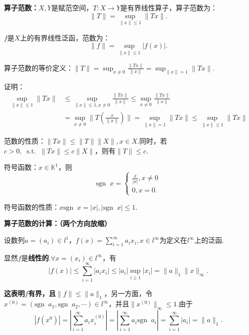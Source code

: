 \documentclass[bwprint, withoutpreface]{cumcmthesis}
\newcommand*{\st}{\mathop{}\!\mathrm{s.t.}\!\mathop{}}
\newcommand*{\norm}[1]{\| #1 \|}
\newcommand*{\nnorm}[2]{\| #1 \|_{#2}}
\newcommand*{\sgn}[1]{\mathrm{sgn}\!\mathop{}#1}
\begin{document}
\textbf{算子范数：}$X, Y$是赋范空间，$T:X \to Y$是有界线性算子，算子范数为：\[\norm{T} = \sup_{\norm{x} \leqslant 1}{\norm{Tx}}.\]

$f$是$X$上的有界线性泛函，范数为：\[\norm{f} = \sup_{\norm{x} \leqslant 1}{|f(x)|}.\]

算子范数的等价定义：$\norm{T} = \sup_{x \neq 0}{\frac{\norm{Tx}}{\norm{x}}} = \sup_{\norm{x} = 1}{\norm{Tx}}$.

证明：
\begin{align*}
	\sup_{\norm{x} \leqslant 1}{\norm{Tx}} & \leqslant \sup_{\norm{x} \leqslant 1, x \neq 0}{\frac{\norm{Tx}}{\norm{x}}} \leqslant \sup_{x \neq 0}{\frac{\norm{Tx}}{\norm{x}}} \\
				         				   & = \sup_{x \neq 0}{\norm{T(\frac{x}{\norm{x}})}} = \sup_{\norm{x} = 1}{\norm{Tx}} \leqslant \sup_{\norm{x} \leqslant 1}{\norm{Tx}}
\end{align*}

范数的性质：$\norm{Tx} \leqslant \norm{T} \norm{X}, x \in X$.同时，若$c > 0, \st \norm{Tx} \leqslant c \norm{X}$，则有$\norm{T} \leqslant c$.

符号函数：$x \in \mathbb{K}^1$，则
\begin{equation*}
	\sgn{x} = 
	\begin{cases}
		\frac{\bar{x}}{|x|}, x \neq 0 \\
		0, x = 0.
	\end{cases}
\end{equation*}

符号函数的性质：$x \sgn{x} = |x|, |\sgn{x}| \leqslant 1$.

\textbf{算子范数的计算：（两个方向放缩）}

设数列$a = (a_i) \in l^1$，$f(x) = \sum_{i = 1}^{\infty}{a_i x_i}, x \in l^{\infty}$为定义在$l^{\infty}$上的泛函.

显然$f$是\textbf{线性的}.$\forall x = (x_i) \in l^{\infty}$，有
\begin{equation*}
	|f(x)| \leqslant \sum_{i = 1}^{\infty}{|a_i x_i|} \leqslant |a_i| \sup_{i \geqslant 1}|x_i| = \nnorm{a}{1} \nnorm{x}{\infty}.
\end{equation*}

\textbf{这表明$f$有界，且$\norm{f} \leqslant \nnorm{a}{1}$}，另一方面，令$x^{(0)} = (\sgn{a_1}, \sgn{a_2}, \cdots) \in l^{\infty}$，并且$\nnorm{x^{(0)}}{\infty} \leqslant 1$.由于
\begin{equation*}
	|f(x^{0})| = |\sum_{i = 1}^{\infty}{a_i x_i^{(0)}}| = |\sum_{i = 1}^{\infty}{a_i \sgn{a_i}}| = \sum_{i = 1}^{\infty}{|a_i|} = \nnorm{a}{1}.
\end{equation*}
\end{document}

